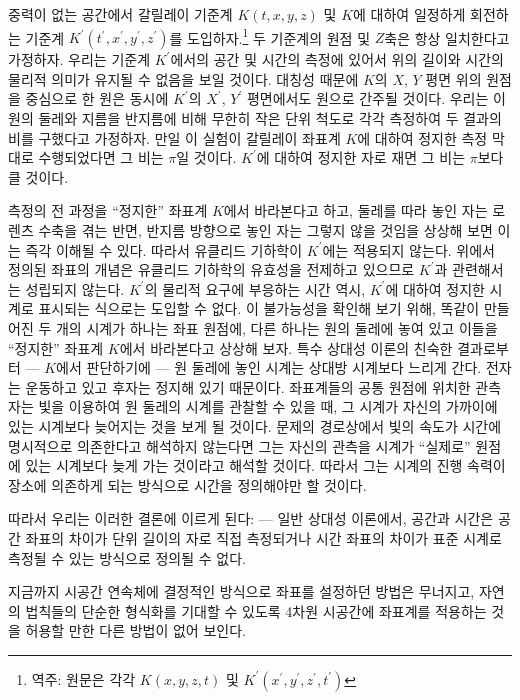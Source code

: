 \documentclass[b5paper]{article}
\begin{document}
중력이 없는 공간에서 갈릴레이 기준계 $K(t, x, y, z)$ 및 $K$에 대하여 일정하게 회전하는 기준계 $K^{\prime}(t^{\prime}, x^{\prime}, y^{\prime}, z^{\prime})$를 도입하자.\footnote{역주: 원문은 각각 $K(x, y, z, t)$ 및 $K^{\prime}(x^{\prime}, y^{\prime}, z^{\prime}, t^{\prime})$} 두 기준계의 원점 및 $Z$축은 항상 일치한다고 가정하자. 우리는 기준계 $K^{\prime}$에서의 공간 및 시간의 측정에 있어서 위의 길이와 시간의 물리적 의미가 유지될 수 없음을 보일 것이다. 대칭성 때문에 $K$의 $X$, $Y$ 평면 위의 원점을 중심으로 한 원은 동시에 $K^{\prime}$의 $X^{\prime}$, $Y^{\prime}$ 평면에서도 원으로 간주될 것이다. 우리는 이 원의 둘레와 지름을 반지름에 비해 무한히 작은 단위 척도로 각각 측정하여 두 결과의 비를 구했다고 가정하자. 만일 이 실험이 갈릴레이 좌표계 $K$에 대하여 정지한 측정 막대로 수행되었다면 그 비는 $\pi$일 것이다. $K^{\prime}$에 대하여 정지한 자로 재면 그 비는 $\pi$보다 클 것이다.

측정의 전 과정을 ``정지한'' 좌표계 $K$에서 바라본다고 하고, 둘레를 따라 놓인 자는 로렌츠 수축을  겪는 반면, 반지름 방향으로 놓인 자는 그렇지 않을 것임을 상상해 보면 이는 즉각 이해될 수 있다. 따라서 유클리드 기하학이 $K^{\prime}$에는 적용되지 않는다. 위에서 정의된 좌표의 개념은 유클리드 기하학의 유효성을 전제하고 있으므로 $K^{\prime}$과 관련해서는 성립되지 않는다. $K^{\prime}$의 물리적 요구에 부응하는 시간 역시, $K^{\prime}$에 대하여 정지한 시계로 표시되는 식으로는 도입할 수 없다. 이 불가능성을 확인해 보기 위해, 똑같이 만들어진 두 개의 시계가 하나는 좌표 원점에, 다른 하나는 원의 둘레에 놓여 있고 이들을 ``정지한'' 좌표계 $K$에서 바라본다고 상상해 보자. 특수 상대성 이론의 친숙한 결과로부터 --- $K$에서 판단하기에 --- 원 둘레에 놓인 시계는 상대방 시계보다 느리게 간다. 전자는 운동하고 있고 후자는 정지해 있기 때문이다. 좌표계들의 공통 원점에 위치한 관측자는 빛을 이용하여 원 둘레의 시계를 관찰할 수 있을 때, 그 시계가 자신의 가까이에 있는 시계보다 늦어지는 것을 보게 될 것이다. 문제의 경로상에서 빛의 속도가 시간에 명시적으로 의존한다고 해석하지 않는다면 그는 자신의 관측을 시계가 ``실제로'' 원점에 있는 시계보다 늦게 가는 것이라고 해석할 것이다. 따라서 그는 시계의 진행 속력이 장소에 의존하게 되는 방식으로 시간을 정의해야만 할 것이다.    

따라서 우리는 이러한 결론에 이르게 된다: --- 일반 상대성 이론에서, 공간과 시간은 공간 좌표의 차이가 단위 길이의 자로 직접 측정되거나 시간 좌표의 차이가 표준 시계로 측정될 수 있는 방식으로 정의될 수 없다.

지금까지 시공간 연속체에 결정적인 방식으로 좌표를 설정하던 방법은 무너지고, 자연의 법칙들의 단순한 형식화를 기대할 수 있도록 4차원 시공간에 좌표계를 적용하는 것을 허용할 만한 다른 방법이 없어 보인다.
\end{document}
